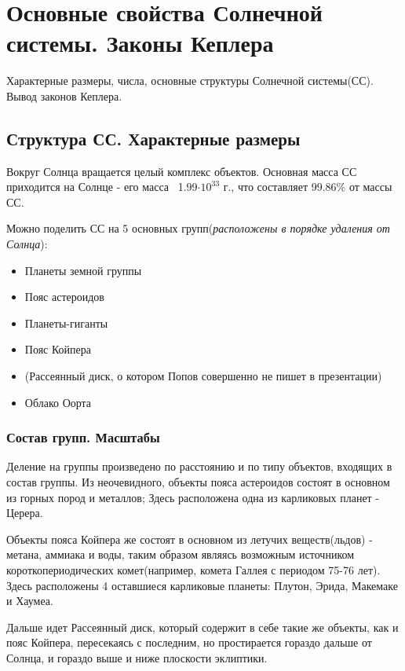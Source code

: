 
\section{Основные свойства Солнечной системы. Законы Кеплера}

Характерные размеры, числа, основные структуры Солнечной системы(СС). Вывод законов Кеплера.

\subsection{Структура СС. Характерные размеры}

Вокруг Солнца вращается целый комплекс объектов. Основная масса СС приходится на Солнце - его масса ~1.99$\cdot 10^{33}$ г., что составляет 99.86\% от массы СС.

Можно поделить СС на 5 основных групп(\textit{расположены в порядке удаления от Солнца}):

\begin{itemize}
	\item Планеты земной группы
	\item Пояс астероидов
	\item Планеты-гиганты
	\item Пояс Койпера
	\item (Рассеянный диск, о котором Попов совершенно не пишет в презентации)
	\item Облако Оорта
\end{itemize}

\subsubsection{Состав групп. Масштабы}

Деление на группы произведено по расстоянию и по типу объектов, входящих в состав группы. Из неочевидного, объекты пояса астероидов состоят в основном из горных пород и металлов; Здесь расположена одна из карликовых планет - Церера.

Объекты пояса Койпера же состоят в основном из летучих веществ(льдов) - метана, аммиака и воды, таким образом являясь возможным источником короткопериодических комет(например, комета Галлея с периодом 75-76 лет). Здесь расположены 4 оставшиеся карликовые планеты: Плутон, Эрида, Макемаке и Хаумеа.

Дальше идет Рассеянный диск, который содержит в себе такие же объекты, как и пояс Койпера, пересекаясь с последним, но простирается гораздо дальше от Солнца, и гораздо выше и ниже плоскости эклиптики.

